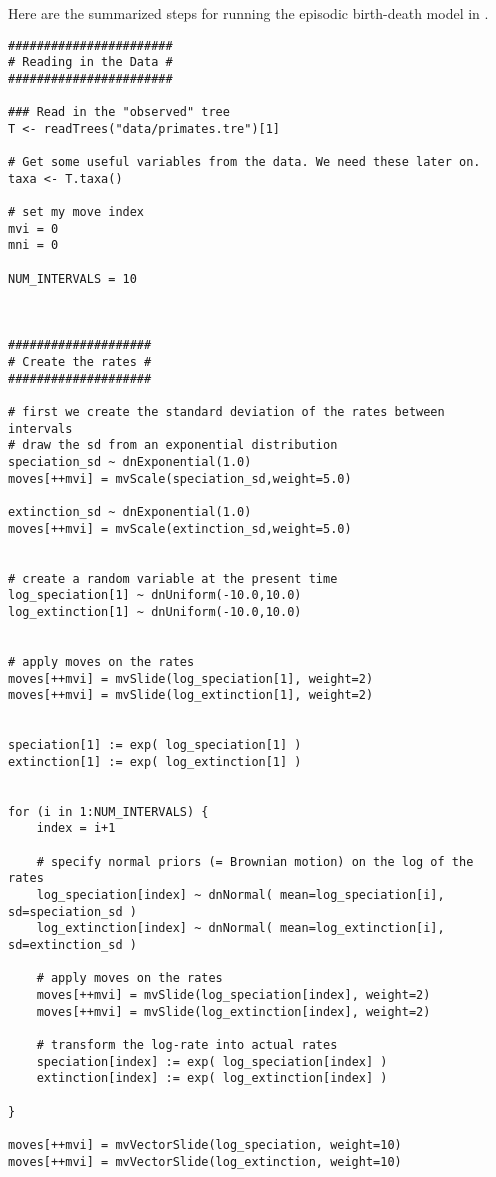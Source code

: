 Here are the summarized steps for running the episodic birth-death model in \Rev.
{\tt \begin{snugshade*}
\begin{lstlisting}
#######################
# Reading in the Data #
#######################

### Read in the "observed" tree
T <- readTrees("data/primates.tre")[1]

# Get some useful variables from the data. We need these later on.
taxa <- T.taxa()

# set my move index
mvi = 0
mni = 0

NUM_INTERVALS = 10



####################
# Create the rates #
####################

# first we create the standard deviation of the rates between intervals
# draw the sd from an exponential distribution
speciation_sd ~ dnExponential(1.0)
moves[++mvi] = mvScale(speciation_sd,weight=5.0)

extinction_sd ~ dnExponential(1.0)
moves[++mvi] = mvScale(extinction_sd,weight=5.0)


# create a random variable at the present time
log_speciation[1] ~ dnUniform(-10.0,10.0)
log_extinction[1] ~ dnUniform(-10.0,10.0)


# apply moves on the rates
moves[++mvi] = mvSlide(log_speciation[1], weight=2)
moves[++mvi] = mvSlide(log_extinction[1], weight=2)


speciation[1] := exp( log_speciation[1] )
extinction[1] := exp( log_extinction[1] )


for (i in 1:NUM_INTERVALS) {
    index = i+1
    
    # specify normal priors (= Brownian motion) on the log of the rates
    log_speciation[index] ~ dnNormal( mean=log_speciation[i], sd=speciation_sd )
    log_extinction[index] ~ dnNormal( mean=log_extinction[i], sd=extinction_sd )

    # apply moves on the rates
    moves[++mvi] = mvSlide(log_speciation[index], weight=2)
    moves[++mvi] = mvSlide(log_extinction[index], weight=2)

    # transform the log-rate into actual rates
    speciation[index] := exp( log_speciation[index] )
    extinction[index] := exp( log_extinction[index] )

}

moves[++mvi] = mvVectorSlide(log_speciation, weight=10)
moves[++mvi] = mvVectorSlide(log_extinction, weight=10)


\end{lstlisting}
\end{snugshade*}}
